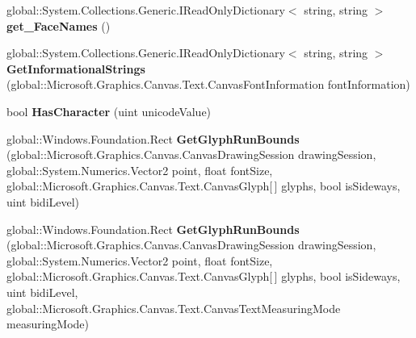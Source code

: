 \begin{DoxyCompactItemize}
\mbox{\label{class_microsoft_1_1_graphics_1_1_canvas_1_1_text_1_1_canvas_font_face_a236b4e875d007d787787ef9a495dd420}} 
global\+::\+System.\+Collections.\+Generic.\+I\+Read\+Only\+Dictionary$<$ string, string $>$ {\bfseries get\+\_\+\+Face\+Names} ()
\item 
\mbox{\label{class_microsoft_1_1_graphics_1_1_canvas_1_1_text_1_1_canvas_font_face_ad17fe050928eabac16474acb5cf094c7}} 
global\+::\+System.\+Collections.\+Generic.\+I\+Read\+Only\+Dictionary$<$ string, string $>$ {\bfseries Get\+Informational\+Strings} (global\+::\+Microsoft.\+Graphics.\+Canvas.\+Text.\+Canvas\+Font\+Information font\+Information)
\item 
\mbox{\label{class_microsoft_1_1_graphics_1_1_canvas_1_1_text_1_1_canvas_font_face_a3b88a765888bcc02c633c1c7ec657e8a}} 
bool {\bfseries Has\+Character} (uint unicode\+Value)
\item 
\mbox{\label{class_microsoft_1_1_graphics_1_1_canvas_1_1_text_1_1_canvas_font_face_aded9ca216e31cb6401b5b09d6da6042b}} 
global\+::\+Windows.\+Foundation.\+Rect {\bfseries Get\+Glyph\+Run\+Bounds} (global\+::\+Microsoft.\+Graphics.\+Canvas.\+Canvas\+Drawing\+Session drawing\+Session, global\+::\+System.\+Numerics.\+Vector2 point, float font\+Size, global\+::\+Microsoft.\+Graphics.\+Canvas.\+Text.\+Canvas\+Glyph\mbox{[}$\,$\mbox{]} glyphs, bool is\+Sideways, uint bidi\+Level)
\item 
\mbox{\label{class_microsoft_1_1_graphics_1_1_canvas_1_1_text_1_1_canvas_font_face_a76b264702a6d7f86be15073bab70e8ac}} 
global\+::\+Windows.\+Foundation.\+Rect {\bfseries Get\+Glyph\+Run\+Bounds} (global\+::\+Microsoft.\+Graphics.\+Canvas.\+Canvas\+Drawing\+Session drawing\+Session, global\+::\+System.\+Numerics.\+Vector2 point, float font\+Size, global\+::\+Microsoft.\+Graphics.\+Canvas.\+Text.\+Canvas\+Glyph\mbox{[}$\,$\mbox{]} glyphs, bool is\+Sideways, uint bidi\+Level, global\+::\+Microsoft.\+Graphics.\+Canvas.\+Text.\+Canvas\+Text\+Measuring\+Mode measuring\+Mode)

\end{DoxyCompactItemize}
